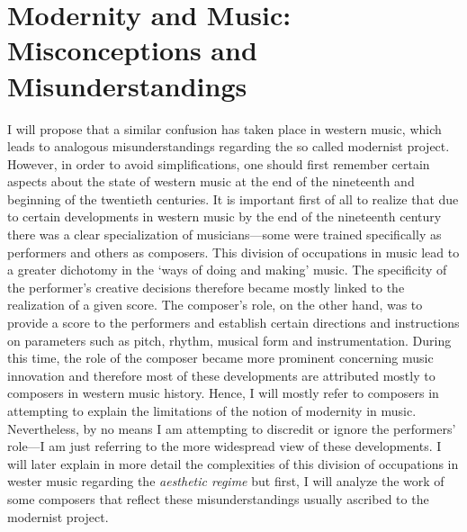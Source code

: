 \section{Modernity and Music: Misconceptions and Misunderstandings}

I will propose that a similar confusion has taken place in western music, which leads to analogous misunderstandings regarding the so called modernist project. However, in order to avoid simplifications, one should first remember certain aspects about the state of western music at the end of the nineteenth and beginning of the twentieth centuries. It is important first of all to realize that due to certain developments in western music by the end of the nineteenth century there was a clear specialization of musicians---some were trained specifically as performers and others as composers. This division of occupations in music lead to a greater dichotomy in the `ways of doing and making' music. The specificity of the performer's creative decisions therefore became mostly linked to the realization of a given score. The composer's role, on the other hand, was to provide a score to the performers and establish certain directions and instructions on parameters such as pitch, rhythm, musical form and instrumentation. During this time, the role of the composer became more prominent concerning music innovation and therefore most of these developments are attributed mostly to composers in western music history. Hence, I will mostly refer to composers in attempting to explain the limitations of the notion of modernity in music. Nevertheless, by no means I am attempting to discredit or ignore the performers' role---I am just referring to the more widespread view of these developments. I will later explain in more detail the complexities of this division of occupations in wester music regarding the \emph{aesthetic regime} but first, I will analyze the work of some composers that reflect these misunderstandings usually ascribed to the modernist project. 

